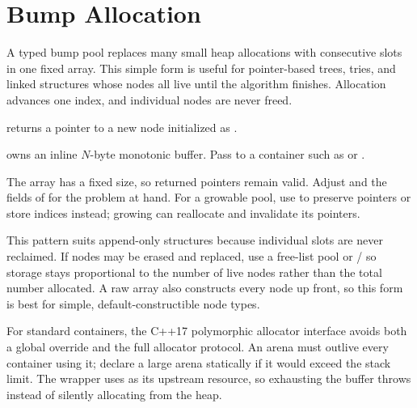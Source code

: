 \section{\texorpdfstring{Bump Allocation}{8.8 Bump Allocation}}
\setcounter{section}{8}
\label{sec:8.8}
A typed bump pool replaces many small heap allocations with consecutive slots in one fixed array. This simple form is useful for pointer-based trees, tries, and linked structures whose nodes all live until the algorithm finishes. Allocation advances one index, and individual nodes are never freed.

\begin{compactitem}
  \item {} returns a pointer to a new node initialized as .
  \item {} owns an inline $N$-byte monotonic buffer. Pass  to a  container such as  or .
\end{compactitem}

The array has a fixed size, so returned pointers remain valid. Adjust  and the fields of  for the problem at hand. For a growable pool, use  to preserve pointers or store indices instead; growing  can reallocate and invalidate its pointers.

This pattern suits append-only structures because individual slots are never reclaimed. If nodes may be erased and replaced, use a free-list pool or / so storage stays proportional to the number of live nodes rather than the total number allocated. A raw array also constructs every node up front, so this form is best for simple, default-constructible node types.

For standard containers, the C++17 polymorphic allocator interface avoids both a global  override and the full allocator protocol. An arena must outlive every container using it; declare a large arena statically if it would exceed the stack limit. The wrapper uses  as its upstream resource, so exhausting the buffer throws  instead of silently allocating from the heap.

